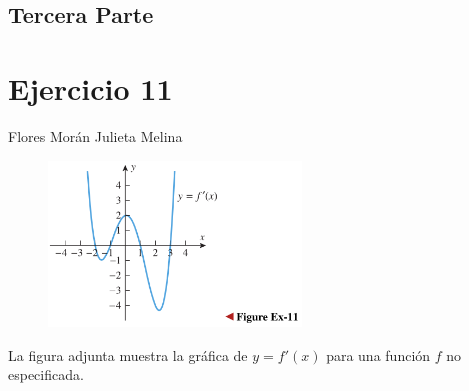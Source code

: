 \documentclass[12pt]{article}
\begin{document}
\subsection*{\centering \textbf{ \LARGE Tercera Parte}}



\section{Ejercicio 11} Flores Morán Julieta Melina \\

\begin{figure}[h!]
\centering
\includegraphics[width=0.6\textwidth]{../img/img_Lista2/3_11.png}
\end{figure}
La figura adjunta muestra la gráfica de $y = f'(x)$ para una función $f$ no especificada.
\end{document}
